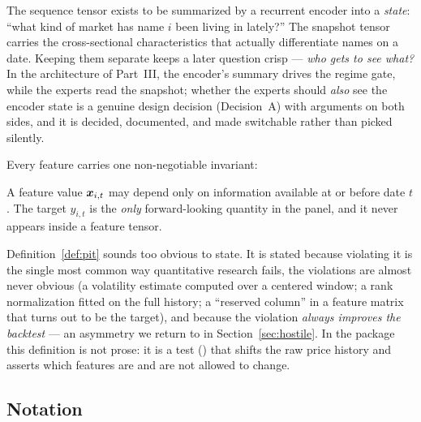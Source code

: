 The sequence tensor exists to be summarized by a recurrent encoder into a
\emph{state}: ``what kind of market has name $i$ been living in lately?'' The
snapshot tensor carries the cross-sectional characteristics that actually
differentiate names on a date. Keeping them separate keeps a later question
crisp --- \emph{who gets to see what?} In the architecture of Part~III, the
encoder's summary drives the regime gate, while the experts read the
snapshot; whether the experts should \emph{also} see the encoder state is a
genuine design decision (Decision~A) with arguments on both sides, and it is
decided, documented, and made switchable rather than picked silently.

Every feature carries one non-negotiable invariant:

\begin{definition}\label{def:pit}
A feature value $\bm{x}_{i,t}$ may depend only on information available at or
before date $t$. The target $y_{i,t}$ is the \emph{only} forward-looking
quantity in the panel, and it never appears inside a feature tensor.
\end{definition}

Definition~\ref{def:pit} sounds too obvious to state. It is stated because
violating it is the single most common way quantitative research fails, the
violations are almost never obvious (a volatility estimate computed over a
centered window; a rank normalization fitted on the full history; a
``reserved column'' in a feature matrix that turns out to be the target), and
because the violation \emph{always improves the backtest} --- an asymmetry we
return to in Section~\ref{sec:hostile}. In the package this definition is not
prose: it is a test () that shifts the raw price
history and asserts which features are and are not allowed to change.

\subsection{Notation}

